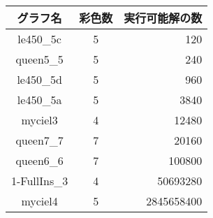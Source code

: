 \begin{tabular}[t]{|ccr|} \hline
  グラフ名 & 彩色数 & 実行可能解の数 \\ \hline \hline
  le450\_5c & 5 & 120 \\
  queen5\_5 & 5 & 240 \\
  le450\_5d & 5 & 960 \\
  le450\_5a & 5 & 3840 \\
  myciel3 & 4 & 12480 \\
  queen7\_7 & 7 & 20160 \\
  queen6\_6 & 7 & 100800 \\
  1-FullIns\_3 & 4 & 50693280 \\
  myciel4 & 5 & 2845658400 \\ \hline

\end{tabular}